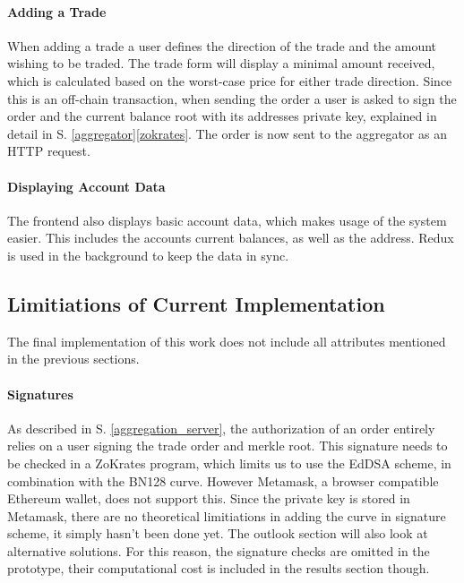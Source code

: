 \documentclass[../../thesis.tex]{subfiles}
\begin{document}
\paragraph{Adding a Trade}
When adding a trade a user defines the direction of the trade and the amount wishing to be traded. The trade form will display a minimal amount received, which is calculated based on the worst-case price for either trade direction. Since this is an off-chain transaction, when sending the order a user is asked to sign the order and the current balance root with its addresses private key, explained in detail in S. \ref{aggregator}\ref{zokrates}. The order is now sent to the aggregator as an HTTP request. 

\paragraph{Displaying Account Data}
The frontend also displays basic account data, which makes usage of the system easier. This includes the accounts current balances, as well as the address. Redux is used in the background to keep the data in sync.

\subsection{Limitiations of Current Implementation}
The final implementation of this work does not include all attributes mentioned in the previous sections. 

\paragraph{Signatures}
As described in S. \ref{aggregation_server}, the authorization of an order entirely relies on a user signing the trade order and merkle root. This signature needs to be checked in a ZoKrates program, which limits us to use the EdDSA scheme, in combination with the BN128 curve. However Metamask, a browser compatible Ethereum wallet, does not support this. Since the private key is stored in Metamask, there are no theoretical limitiations in adding the curve in signature scheme, it simply hasn't been done yet. The outlook section will also look at alternative solutions. For this reason, the signature checks are omitted in the prototype, their computational cost is included in the results section though.
\end{document}
